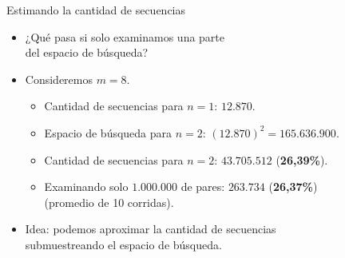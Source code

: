 \documentclass[spanish,xcolor={table}]{beamer}
\begin{document}

\begin{frame}{Estimando la cantidad de secuencias}

\begin{itemize}
  \item ¿Qué pasa si solo examinamos una parte \\ del espacio de búsqueda?
  \item Consideremos $m = 8$.
  \begin{itemize}
    \item Cantidad de secuencias para $n=1$: $12.870$.
    \item Espacio de búsqueda para $n=2$: $(12.870)^2 = 165.636.900$.
    \item Cantidad de secuencias para $n=2$: $43.705.512$ (\textbf{26,39\%}).
    \item Examinando solo $1.000.000$ de pares: $263.734$ (\textbf{26,37\%}) \\
      (promedio de 10 corridas).
  \end{itemize}
  \item Idea: podemos aproximar la cantidad de secuencias \\ submuestreando el
  espacio de búsqueda.
\end{itemize}  

\end{frame}

\end{document}
